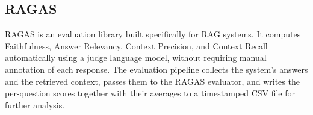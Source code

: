 \subsection{RAGAS}

RAGAS \cite{es2024ragas} is an evaluation library built specifically for RAG
systems. It computes Faithfulness, Answer Relevancy, Context Precision, and
Context Recall automatically using a judge language model, without requiring manual
annotation of each response. The evaluation pipeline collects the system's answers
and the retrieved context, passes them to the RAGAS evaluator, and writes the
per-question scores together with their averages to a timestamped CSV file for
further analysis.

